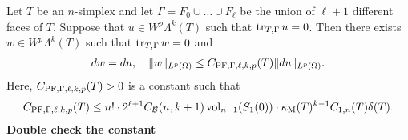 \documentclass[10pt,a4paper]{article}
\newcommand{\todo}[1]{{\color{RedOrange}\textbf{#1}}}
\begin{document}
\begin{lemma}\label{lemma:mixedbconsimplex:exteriorderivative}
    Let $T$ be an $n$-simplex 
    and let $\Gamma = F_{0} \cup \dots \cup F_{\ell}$ be the union of $\ell+1$ different faces of $T$. 
    Suppose that $u \in W^{p}\Lambda^{k}(T)$ such that 
    $\operatorname{tr}_{T,\Gamma} u = 0$.
    Then there exists $w \in W^{p}\Lambda^{k}(T)$ such that 
    $\operatorname{tr}_{T,\Gamma} w = 0$
    and  
    \begin{align*}
        d w = d u,
        \quad 
        \| w \|_{L^{p}(\Omega)} 
        \leq 
        C_{{\rm PF},\Gamma,\ell,k,p}(T)
        \| d u \|_{L^{p}(\Omega)}
        .
    \end{align*}
    Here, $C_{{\rm PF},\Gamma,\ell,k,p}(T) > 0$ is a constant such that 
    \begin{align*}
        C_{{\rm PF},\Gamma,\ell,k,p}(T)
        \leq 
        n! \cdot 2^{\ell+1} 
        C_{{\mathcal B}}(n,k+1) 
        \operatorname{vol}_{n-1}(S_1(0))
        \cdot 
        \kappa_{\rm M}(T)^{k-1}
        C_{1,n}(T) 
        {\delta}(T)
        .
    \end{align*}
    \todo{Double check the constant}
\end{lemma}
\end{document}
